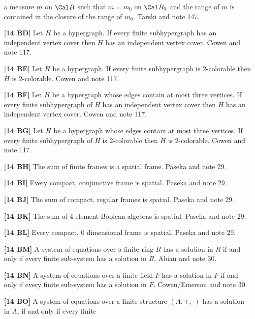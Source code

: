 a measure $m$ on $\Cal B$ such that $m=m_0$ on $\Cal B_0$ and the range
of $m$ is contained in the closure of the range of $m_0$.
\ac{Tarski} \cite{1930} and note 147.
\smallskip
\item{}{\bf [14 BD]} Let $H$ be a hypergraph. If every finite subhypergraph
has an independent vertex cover then $H$ has an independent vertex cover.
\ac{Cowen} \cite{1990} and note 117.
\smallskip
\item{}{\bf [14 BE]} Let $H$ be a hypergraph. If every finite subhypergraph
is 2-colorable then $H$ is 2-colorable. \ac{Cowen} \cite{1990} and note 117.
\smallskip
\item{}{\bf [14 BF]}  Let $H$ be a hypergraph whose edges contain at most
three vertices. If every finite subhypergraph of $H$ has an independent
vertex cover then $H$ has an independent vertex cover.
\ac{Cowen} \cite{1990} and note 117.
\smallskip
\item{}{\bf [14 BG]}  Let $H$ be a hypergraph whose edges contain at most
three vertices. If every finite subhypergraph of $H$ is 2-colorable then
$H$ is 2-colorable.  \ac{Cowen} \cite{1990} and note 117.
\smallskip
\item{}{\bf [14 BH]} The sum of finite frames is a spatial frame.
\ac{Paseka} \cite{1989} and note 29.
\smallskip
\item{}{\bf [14 BI]} Every compact, conjunctive frame is spatial.
\ac{Paseka} \cite{1989} and note 29.
\smallskip
\item{}{\bf [14 BJ]} The sum of compact, regular frames is spatial.
\ac{Paseka} \cite{1989} and note 29.
\smallskip
\item{}{\bf [14 BK]} The sum of 4-element Boolean algebras is spatial.
\ac{Paseka} \cite{1989} and note 29.
\smallskip
\item{}{\bf [14 BL]} Every compact, 0 dimensional frame is spatial.
\ac{Paseka} \cite{1989} and note 29.
\smallskip
\item{}{\bf [14 BM]}  A system of equations over a finite
ring $R$ has a solution in $R$ if and only if every finite sub-system
has a solution in $R$.  \ac{Abian} \cite{1972} and note 30.
\smallskip
\item{}{\bf [14 BN]} A system of equations over a finite field $F$ has a
solution in $F$ if and only if every finite sub-system has a solution
in $F$. \ac{Cowen/Emerson} \cite{1996} and note 30.
\smallskip
\item{}{\bf [14 BO]} A system of equations over a finite structure
$(A,+,\cdot)$ has a solution in $A$, if and only if every finite
